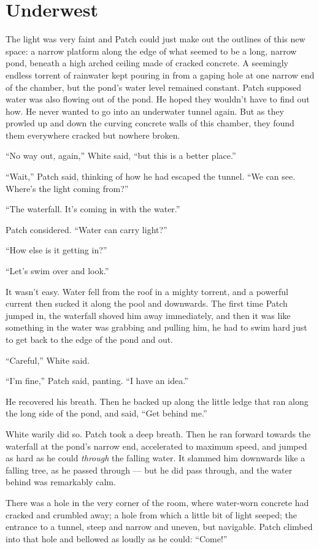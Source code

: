 \documentclass[ebook,oneside,openany,17pt]{memoir}
\renewcommand{\thechapter}{\Roman{chapter}}
\newcounter{sections}
\newcommand{\sections}[1]{%
  \section*{#1}
  \addtocounter{sections}{1}%
  \pdfbookmark[1]{#1}{section.\thechapter.\thesections}}
\begin{document}

\sections{Underwest}

The light was very faint and Patch could just make out the outlines of
this new space: a narrow platform along the edge of what seemed to be
a long, narrow pond, beneath a high arched ceiling made of cracked
concrete. A seemingly endless torrent of rainwater kept pouring in
from a gaping hole at one narrow end of the chamber, but the pond’s
water level remained constant. Patch supposed water was also flowing
out of the pond. He hoped they wouldn’t have to find out how. He never
wanted to go into an underwater tunnel again. But as they prowled up
and down the curving concrete walls of this chamber, they found them
everywhere cracked but nowhere broken.

“No way out, again,” White said, “but this is a better place.”

“Wait,” Patch said, thinking of how he had escaped the tunnel. “We can
see. Where’s the light coming from?”

“The waterfall. It’s coming in with the water.”

Patch considered. “Water can carry light?”

“How else is it getting in?”

“Let’s swim over and look.”

It wasn’t easy. Water fell from the roof in a mighty torrent, and a
powerful current then sucked it along the pool and downwards. The
first time Patch jumped in, the waterfall shoved him away immediately,
and then it was like something in the water was grabbing and pulling
him, he had to swim hard just to get back to the edge of the pond and
out.

“Careful,” White said.

“I’m fine,” Patch said, panting. “I have an idea.”

He recovered his breath. Then he backed up along the little ledge that
ran along the long side of the pond, and said, “Get behind me.”

White warily did so. Patch took a deep breath. Then he ran forward
towards the waterfall at the pond’s narrow end, accelerated to maximum
speed, and jumped as hard as he could \emph{through }the falling
water. It slammed him downwards like a falling tree, as he passed
through — but he did pass through, and the water behind was remarkably
calm.

There was a hole in the very corner of the room, where water-worn
concrete had cracked and crumbled away; a hole from which a little bit
of light seeped; the entrance to a tunnel, steep and narrow and
uneven, but navigable. Patch climbed into that hole and bellowed as
loudly as he could: “Come!”
\end{document}

